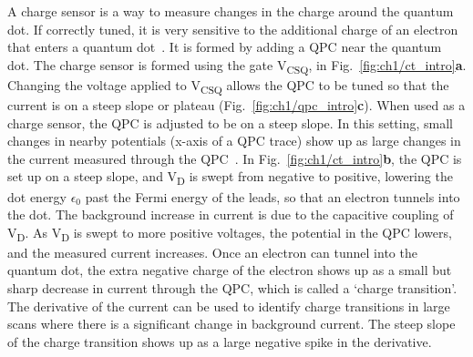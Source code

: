 A charge sensor is a way to measure changes in the charge around the quantum dot. If correctly tuned, it is very sensitive to the additional charge of an electron that enters a quantum dot~\cite{Field1993,Schleser2004,Vandersypen2004}. It is formed by adding a QPC near the quantum dot. The charge sensor is formed using the gate V\textsubscript{CSQ}, in Fig.~\ref{fig:ch1/ct_intro}\textbf{a}. Changing the voltage applied to V\textsubscript{CSQ} allows the QPC to be tuned so that the current is on a steep slope or plateau (Fig.~\ref{fig:ch1/qpc_intro}\textbf{c}). When used as a charge sensor, the QPC is adjusted to be on a steep slope. In this setting, small changes in nearby potentials (x-axis of a QPC trace) show up as large changes in the current measured through the QPC~\cite{cs_design}. In Fig.~\ref{fig:ch1/ct_intro}\textbf{b}, the QPC is set up on a steep slope, and V\textsubscript{D} is swept from negative to positive, lowering the dot energy $\epsilon_0$ past the Fermi energy of the leads, so that an electron tunnels into the dot. The background increase in current is due to the capacitive coupling of V\textsubscript{D}. As V\textsubscript{D} is swept to more positive voltages, the potential in the QPC lowers, and the measured current increases. Once an electron can tunnel into the quantum dot, the extra negative charge of the electron shows up as a small but sharp decrease in current through the QPC, which is called a `charge transition'. The derivative of the current can be used to identify charge transitions in large scans where there is a significant change in background current. The steep slope of the charge transition shows up as a large negative spike in the derivative. 


